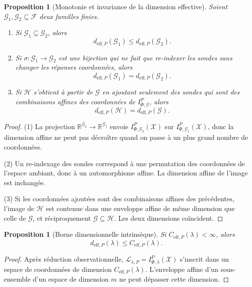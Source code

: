 \documentclass[11pt,a4paper,openany]{book}
\newtheorem{proposition}[definition]{Proposition}
\begin{document}
\begin{proposition}[Monotonie et invariance de la dimension effective]
Soient \(\mathcal G_1,\mathcal G_2\subseteq\mathcal F\) deux familles finies.
\begin{enumerate}[label=\arabic*.]
\item Si \(\mathcal G_1\subseteq \mathcal G_2\), alors
\[
d_{\mathrm{eff},P}(\mathcal G_1)\le d_{\mathrm{eff},P}(\mathcal G_2).
\]
\item Si \(\sigma:\mathcal G_1\to\mathcal G_2\) est une bijection qui ne fait que re-indexer les sondes sans changer les réponses coordonnées, alors
\[
d_{\mathrm{eff},P}(\mathcal G_1)=d_{\mathrm{eff},P}(\mathcal G_2).
\]
\item Si \(\mathcal H\) s'obtient à partir de \(\mathcal G\) en ajoutant seulement des sondes qui sont des combinaisons affines des coordonnées de \(I_{\Phi,\mathcal G}^P\), alors
\[
d_{\mathrm{eff},P}(\mathcal H)=d_{\mathrm{eff},P}(\mathcal G).
\]
\end{enumerate}
\end{proposition}

\begin{proof}
(1) La projection \(\mathbb R^{\mathcal G_2}\to \mathbb R^{\mathcal G_1}\) envoie \(I_{\Phi,\mathcal G_2}^P(\mathcal X)\) sur \(I_{\Phi,\mathcal G_1}^P(\mathcal X)\), donc la dimension affine ne peut pas décroître quand on passe à un plus grand nombre de coordonnées.

(2) Un re-indexage des sondes correspond à une permutation des coordonnées de l'espace ambiant, donc à un automorphisme affine. La dimension affine de l'image est inchangée.

(3) Si les coordonnées ajoutées sont des combinaisons affines des précédentes, l'image de \(\mathcal H\) est contenue dans une enveloppe affine de même dimension que celle de \(\mathcal G\), et réciproquement \(\mathcal G\subseteq\mathcal H\). Les deux dimensions coïncident.
\end{proof}

\begin{proposition}[Borne dimensionnelle intrinsèque]
Si \(C_{\mathrm{eff},P}(\lambda)<\infty\), alors
\[
d_{\mathrm{eff},P}(\lambda)\le C_{\mathrm{eff},P}(\lambda).
\]
\end{proposition}

\begin{proof}
Après réduction observationnelle, \(\mathcal L_{\lambda,P}=I_{\Phi,\lambda}^P(\mathcal X)\) s'inscrit dans un espace de coordonnées de dimension \(C_{\mathrm{eff},P}(\lambda)\). L'enveloppe affine d'un sous-ensemble d'un espace de dimension \(m\) ne peut dépasser cette dimension.
\end{proof}
\end{document}
